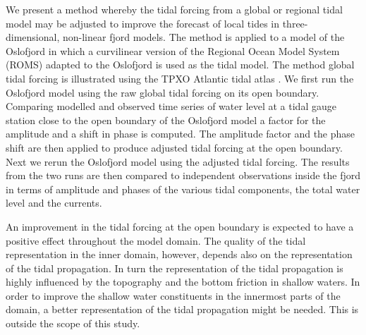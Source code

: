We present a method whereby the tidal forcing from a global or regional tidal model may be adjusted to improve the forecast of local tides in three-dimensional, non-linear fjord models. 
The method is applied to a model of the Oslofjord in which a curvilinear version of the Regional Ocean Model System (ROMS) \citep{shchepetkin05,shchepetkin09,haidvogel08} adapted to the Oslofjord is used as the tidal model. The method global tidal forcing is illustrated using the TPXO Atlantic tidal atlas \citep{egbert94,egbert02}.
We first run the Oslofjord model using the raw global tidal forcing on its open boundary. Comparing modelled and observed time series of water level at a tidal gauge station close to the open boundary of the Oslofjord model a factor for the amplitude and a shift in phase is computed. The amplitude factor and the phase shift are then applied to produce adjusted tidal forcing at the open boundary. Next we rerun the Oslofjord model using the adjusted tidal forcing. The results from the two runs are then compared to independent observations inside the fjord in terms of amplitude and phases of the various tidal components, the total water level and the currents.

An improvement in the tidal forcing at the open boundary is expected to have a positive effect throughout the model domain. The quality of the tidal representation in the inner domain, however, depends also on the representation of the tidal propagation. In turn the representation of the tidal propagation is highly influenced by the topography and the bottom friction in shallow waters. In order to improve the shallow water constituents in the innermost parts of the domain, a better representation of the tidal propagation might be needed. This is outside the scope of this study. 
